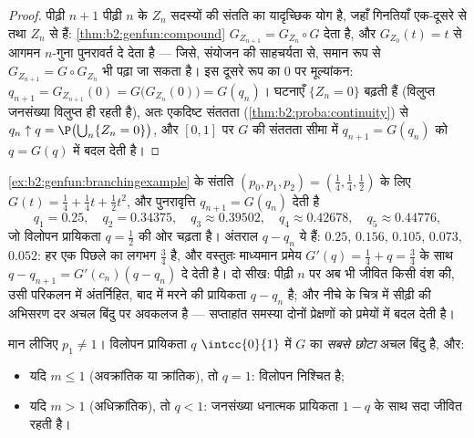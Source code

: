 \begin{proof}
पीढ़ी $n + 1$ पीढ़ी $n$ के $Z_n$ सदस्यों की संतति का यादृच्छिक योग है,
जहाँ गिनतियाँ एक-दूसरे से तथा $Z_n$ से  हैं: \cref{thm:b2:genfun:compound} $G_{Z_{n+1}} =
G_{Z_n} \circ G$ देता है,
और $G_{Z_0}(t) = t$ से आगमन $n$-गुना पुनरावर्त दे देता है --- जिसे, संयोजन की
साहचर्यता से, समान रूप से $G_{Z_{n+1}} = G \circ G_{Z_n}$ भी पढ़ा जा सकता है। इस दूसरे रूप का
$0$ पर मूल्यांकन: $q_{n+1} = G_{Z_{n+1}}(0) =
G\bigl(G_{Z_n}(0)\bigr) = G(q_n)$। घटनाएँ $\{Z_n = 0\}$ बढ़ती हैं (विलुप्त जनसंख्या
विलुप्त ही रहती है), अतः एकदिष्ट संततता (\cref{thm:b2:proba:continuity}) से $q_n \uparrow q = \P\bigl(\bigcup_n\{Z_n = 0\}\bigr)$, और $[0, 1]$
पर $G$ की संततता सीमा में $q_{n+1} = G(q_n)$ को $q =
G(q)$ में बदल देती है।
\end{proof}

\begin{example}[विलोपन को अभिसरित होते देखना]
\label{ex:b2:genfun:cobwebnumerics}
\cref{ex:b2:genfun:branchingexample} के संतति  $(p_0, p_1, p_2) = (\tfrac14,
\tfrac14, \tfrac12)$ के लिए $G(t) = \tfrac14 + \tfrac14t + \tfrac12t^2$, और पुनरावृत्ति $q_{n+1} = G(q_n)$ देती है
\[
q_1 = 0.25, \quad q_2 = 0.34375, \quad q_3 \approx 0.39502,
\quad q_4 \approx 0.42678, \quad q_5 \approx 0.44776,
\]
जो विलोपन प्रायिकता $q = \tfrac12$ की ओर चढ़ता है। अंतराल $q - q_n$ ये हैं: $0.25$,
$0.156$, $0.105$, $0.073$, $0.052$: हर एक पिछले का लगभग $\tfrac34$ है, और वस्तुतः
माध्यमान प्रमेय $G'(q) = \tfrac14 + q = \tfrac34$ के साथ $q - q_{n+1} = G'(c_n)(q
- q_n)$ दे देती है। दो सीख: पीढ़ी $n$
पर अब भी जीवित किसी वंश की, उसी परिकलन में अंतर्निहित, बाद में
मरने की प्रायिकता $q - q_n$ है; और नीचे के चित्र में सीढ़ी की अभिसरण
दर अचल बिंदु पर अवकलज है --- सप्ताहांत समस्या दोनों प्रेक्षणों को
प्रमेयों में बदल देती है।
\end{example}

\begin{theorem}[विलोपन कसौटी]\label{thm:b2:genfun:extinction}
मान लीजिए $p_1 \neq 1$। विलोपन प्रायिकता $q$ $\intcc{0}{1}$ में $G$ का
\emph{सबसे छोटा} अचल बिंदु है, और:
\begin{itemize}
\item यदि $m \leq 1$ (अवक्रांतिक या क्रांतिक), तो $q = 1$: विलोपन निश्चित है;
\item यदि $m > 1$ (अधिक्रांतिक), तो $q < 1$: जनसंख्या धनात्मक प्रायिकता
$1 - q$ के साथ सदा जीवित रहती है।
\end{itemize}
\end{theorem}

